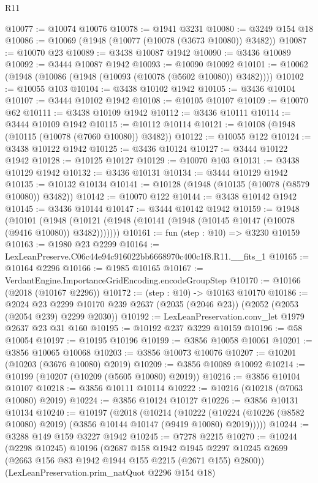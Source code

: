 \begin{lexlean}{R11}
\begin{coremodule}
@10077 := @10074 @10076
@10078 := @1941 @3231
@10080 := @3249 @154 @18
@10086 := @10069 (@1948 (@10077 (@10078 (@3673 @10080)) @3482))
@10087 := @10070 @23
@10089 := @3438 @10087 @1942
@10090 := @3436 @10089
@10092 := @3444 @10087 @1942
@10093 := @10090 @10092
@10101 := @10062 (@1948 (@10086 (@1948 (@10093 (@10078 (@5602 @10080)) @3482))))
@10102 := @10055 @103
@10104 := @3438 @10102 @1942
@10105 := @3436 @10104
@10107 := @3444 @10102 @1942
@10108 := @10105 @10107
@10109 := @10070 @62
@10111 := @3438 @10109 @1942
@10112 := @3436 @10111
@10114 := @3444 @10109 @1942
@10115 := @10112 @10114
@10121 := @10108 (@1948 (@10115 (@10078 (@7060 @10080)) @3482))
@10122 := @10055 @122
@10124 := @3438 @10122 @1942
@10125 := @3436 @10124
@10127 := @3444 @10122 @1942
@10128 := @10125 @10127
@10129 := @10070 @103
@10131 := @3438 @10129 @1942
@10132 := @3436 @10131
@10134 := @3444 @10129 @1942
@10135 := @10132 @10134
@10141 := @10128 (@1948 (@10135 (@10078 (@8579 @10080)) @3482))
@10142 := @10070 @122
@10144 := @3438 @10142 @1942
@10145 := @3436 @10144
@10147 := @3444 @10142 @1942
@10159 := @1948
    (@10101 (@1948 (@10121 (@1948 (@10141 (@1948 (@10145 @10147 (@10078 (@9416 @10080)) @3482)))))))
@10161 := fun (step : @10) => @3230 @10159
@10163 := @1980 @23 @2299
@10164 := LexLeanPreserve.C06c44e94c916022bb6668970c400c1f8.R11.__fits_1
@10165 := @10164 @2296
@10166 := @1985 @10165
@10167 := VerdantEngine.ImportanceGridEncoding.encodeGroupStep
@10170 := @10166 (@2018 (@10167 @2296))
@10172 := (step : @10) -> @10163 @10170
@10186 := @2024
    @23
    @2299
    @10170
    @239
    @2637
    (@2035 (@2046 @23))
    (@2052 (@2053 (@2054 @239) @2299 @2030))
@10192 := LexLeanPreservation.conv_let @1979 @2637 @23 @31 @160
@10195 := @10192 @237 @3229 @10159
@10196 := @58 @10054
@10197 := @10195 @10196
@10199 := @3856 @10058 @10061
@10201 := @3856 @10065 @10068
@10203 := @3856 @10073 @10076
@10207 := @10201 (@10203 (@3676 @10080) @2019)
@10209 := @3856 @10089 @10092
@10214 := @10199 (@10207 (@10209 (@5605 @10080) @2019))
@10216 := @3856 @10104 @10107
@10218 := @3856 @10111 @10114
@10222 := @10216 (@10218 (@7063 @10080) @2019)
@10224 := @3856 @10124 @10127
@10226 := @3856 @10131 @10134
@10240 := @10197
    (@2018
      (@10214
        (@10222 (@10224 (@10226 (@8582 @10080) @2019) (@3856 @10144 @10147 (@9419 @10080) @2019)))))
@10244 := @3288 @149 @159 @3227 @1942
@10245 := @7278 @2215
@10270 := @10244
    (@2298 @10245)
    @10196
    (@2687
      @158
      @1942
      @1945
      @2297
      @10245
      @2699
      (@2663 @156 @83 @1942 @1944 @155 @2215 (@2671 @155) @2800))
    (LexLeanPreservation.prim_natQuot @2296 @154 @18)

\end{coremodule}
\end{lexlean}
